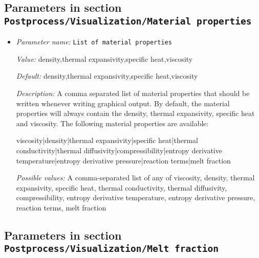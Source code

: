 \subsection{Parameters in section \tt Postprocess/Visualization/Material properties}
\label{parameters:Postprocess/Visualization/Material_20properties}

\begin{itemize}
\item {\it Parameter name:} {\tt List of material properties}
\label{parameters:Postprocess/Visualization/Material properties/List of material properties}
\label{parameters:Postprocess/Visualization/Material_20properties/List_20of_20material_20properties}


{\it Value:} density,thermal expansivity,specific heat,viscosity


{\it Default:} density,thermal expansivity,specific heat,viscosity


{\it Description:} A comma separated list of material properties that should be written whenever writing graphical output. By default, the material properties will always contain the density, thermal expansivity, specific heat and viscosity. The following material properties are available:

viscosity|density|thermal expansivity|specific heat|thermal conductivity|thermal diffusivity|compressibility|entropy derivative temperature|entropy derivative pressure|reaction terms|melt fraction


{\it Possible values:} A comma-separated list of any of viscosity, density, thermal expansivity, specific heat, thermal conductivity, thermal diffusivity, compressibility, entropy derivative temperature, entropy derivative pressure, reaction terms, melt fraction
\end{itemize}

\subsection{Parameters in section \tt Postprocess/Visualization/Melt fraction}
\label{parameters:Postprocess/Visualization/Melt_20fraction}

